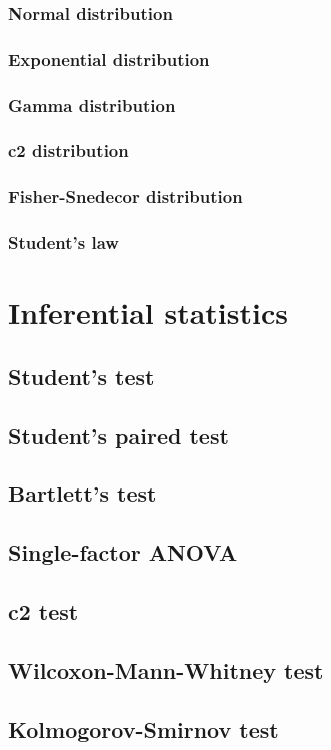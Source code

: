 \documentclass{report}
\begin{document}
		\subsection{Normal distribution}
		\subsection{Exponential distribution}
		\subsection{Gamma distribution}
		\subsection{c2 distribution}
		\subsection{Fisher-Snedecor distribution}
		\subsection{Student’s law}

\chapter{Inferential statistics}\label{chap:inferential}
	\section{Student’s test}
	\section{Student’s paired test}
	\section{Bartlett’s test}
	\section{Single-factor ANOVA}
	\section{c2 test}
	\section{Wilcoxon-Mann-Whitney test}
	\section{Kolmogorov-Smirnov test}
\end{document}
